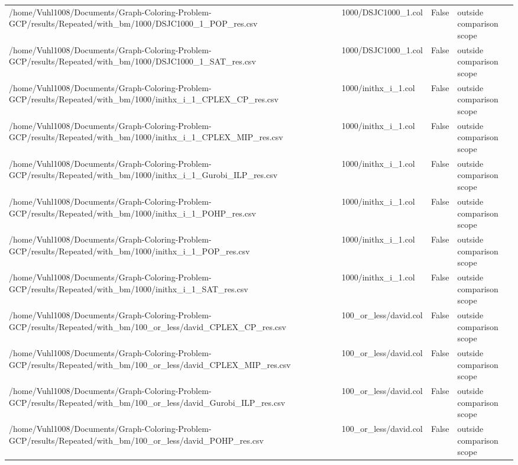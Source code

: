 \begin{table}[htbp]
\begin{tabular}{llll}
/home/Vuhl1008/Documents/Graph-Coloring-Problem-GCP/results/Repeated/with\_bm/1000/DSJC1000\_1\_POP\_res.csv & 1000/DSJC1000\_1.col & False & outside comparison scope \\
/home/Vuhl1008/Documents/Graph-Coloring-Problem-GCP/results/Repeated/with\_bm/1000/DSJC1000\_1\_SAT\_res.csv & 1000/DSJC1000\_1.col & False & outside comparison scope \\
/home/Vuhl1008/Documents/Graph-Coloring-Problem-GCP/results/Repeated/with\_bm/1000/inithx\_i\_1\_CPLEX\_CP\_res.csv & 1000/inithx\_i\_1.col & False & outside comparison scope \\
/home/Vuhl1008/Documents/Graph-Coloring-Problem-GCP/results/Repeated/with\_bm/1000/inithx\_i\_1\_CPLEX\_MIP\_res.csv & 1000/inithx\_i\_1.col & False & outside comparison scope \\
/home/Vuhl1008/Documents/Graph-Coloring-Problem-GCP/results/Repeated/with\_bm/1000/inithx\_i\_1\_Gurobi\_ILP\_res.csv & 1000/inithx\_i\_1.col & False & outside comparison scope \\
/home/Vuhl1008/Documents/Graph-Coloring-Problem-GCP/results/Repeated/with\_bm/1000/inithx\_i\_1\_POHP\_res.csv & 1000/inithx\_i\_1.col & False & outside comparison scope \\
/home/Vuhl1008/Documents/Graph-Coloring-Problem-GCP/results/Repeated/with\_bm/1000/inithx\_i\_1\_POP\_res.csv & 1000/inithx\_i\_1.col & False & outside comparison scope \\
/home/Vuhl1008/Documents/Graph-Coloring-Problem-GCP/results/Repeated/with\_bm/1000/inithx\_i\_1\_SAT\_res.csv & 1000/inithx\_i\_1.col & False & outside comparison scope \\
/home/Vuhl1008/Documents/Graph-Coloring-Problem-GCP/results/Repeated/with\_bm/100\_or\_less/david\_CPLEX\_CP\_res.csv & 100\_or\_less/david.col & False & outside comparison scope \\
/home/Vuhl1008/Documents/Graph-Coloring-Problem-GCP/results/Repeated/with\_bm/100\_or\_less/david\_CPLEX\_MIP\_res.csv & 100\_or\_less/david.col & False & outside comparison scope \\
/home/Vuhl1008/Documents/Graph-Coloring-Problem-GCP/results/Repeated/with\_bm/100\_or\_less/david\_Gurobi\_ILP\_res.csv & 100\_or\_less/david.col & False & outside comparison scope \\
/home/Vuhl1008/Documents/Graph-Coloring-Problem-GCP/results/Repeated/with\_bm/100\_or\_less/david\_POHP\_res.csv & 100\_or\_less/david.col & False & outside comparison scope \\

\end{tabular}
\end{table}
